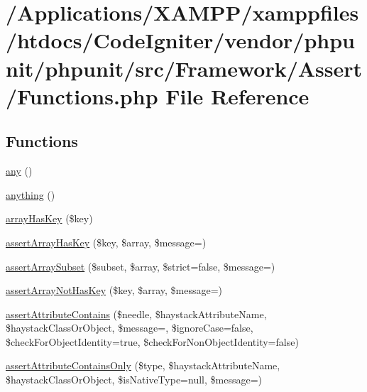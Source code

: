 \hypertarget{_functions_8php}{}\section{/\+Applications/\+X\+A\+M\+P\+P/xamppfiles/htdocs/\+Code\+Igniter/vendor/phpunit/phpunit/src/\+Framework/\+Assert/\+Functions.php File Reference}
\label{_functions_8php}
\subsection*{Functions}
\begin{DoxyCompactItemize}
\item 
\mbox{\hyperlink{_functions_8php_aa950afcee01981fe0485ce00ff0e8e8c}{any}} ()
\item 
\mbox{\hyperlink{_functions_8php_a7b7acdbecdca53ad57267d743ede7653}{anything}} ()
\item 
\mbox{\hyperlink{_functions_8php_ad508cfb1870b428434bfe9bb80a1342d}{array\+Has\+Key}} (\$key)
\item 
\mbox{\hyperlink{_functions_8php_abaec8b6dc06207cc28e4d203ab7bef61}{assert\+Array\+Has\+Key}} (\$key, \$array, \$message=\textquotesingle{}\textquotesingle{})
\item 
\mbox{\hyperlink{_functions_8php_a5a615e4c846b70941ea08a307b935a93}{assert\+Array\+Subset}} (\$subset, \$array, \$strict=false, \$message=\textquotesingle{}\textquotesingle{})
\item 
\mbox{\hyperlink{_functions_8php_ae4bdb238b7d689a21c1adf1d2a137c05}{assert\+Array\+Not\+Has\+Key}} (\$key, \$array, \$message=\textquotesingle{}\textquotesingle{})
\item 
\mbox{\hyperlink{_functions_8php_ad5aa1a2a5a9f15523c5703228a480ba8}{assert\+Attribute\+Contains}} (\$needle, \$haystack\+Attribute\+Name, \$haystack\+Class\+Or\+Object, \$message=\textquotesingle{}\textquotesingle{}, \$ignore\+Case=false, \$check\+For\+Object\+Identity=true, \$check\+For\+Non\+Object\+Identity=false)
\item 
\mbox{\hyperlink{_functions_8php_a8687aacb44ac1ba6dd3a3a22fa536d1f}{assert\+Attribute\+Contains\+Only}} (\$type, \$haystack\+Attribute\+Name, \$haystack\+Class\+Or\+Object, \$is\+Native\+Type=null, \$message=\textquotesingle{}\textquotesingle{})
\item 

\end{DoxyCompactItemize}
